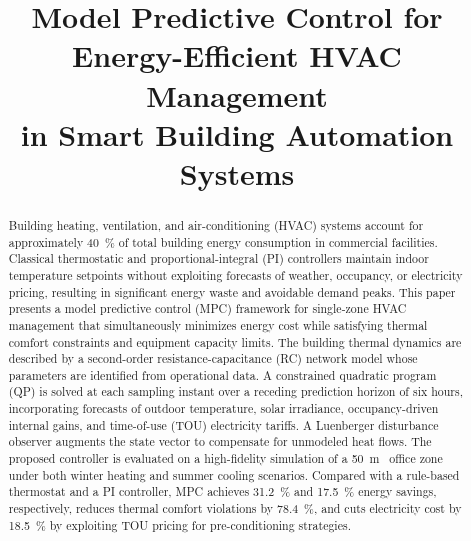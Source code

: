 \documentclass[conference,a4paper]{IEEEtran}[2015/08/26]
\begin{document}

\title{Model Predictive Control for Energy-Efficient {HVAC} Management\\
       in Smart Building Automation Systems}

\author{%
}

\maketitle

\begin{abstract}
Building heating, ventilation, and air-conditioning (HVAC) systems
account for approximately \SI{40}{\percent} of total building energy
consumption in commercial facilities. Classical thermostatic and
proportional-integral (PI) controllers maintain indoor temperature
setpoints without exploiting forecasts of weather, occupancy, or
electricity pricing, resulting in significant energy waste and avoidable
demand peaks. This paper presents a model predictive control (MPC)
framework for single-zone HVAC management that simultaneously minimizes
energy cost while satisfying thermal comfort constraints and equipment
capacity limits. The building thermal dynamics are described by a
second-order resistance-capacitance (RC) network model whose parameters
are identified from operational data. A constrained quadratic program
(QP) is solved at each sampling instant over a receding prediction
horizon of six hours, incorporating forecasts of outdoor temperature,
solar irradiance, occupancy-driven internal gains, and time-of-use (TOU)
electricity tariffs. A Luenberger disturbance observer augments the
state vector to compensate for unmodeled heat flows. The proposed
controller is evaluated on a high-fidelity simulation of a \SI{50}{\metre
\squared} office zone under both winter heating and summer cooling
scenarios. Compared with a rule-based thermostat and a PI controller,
MPC achieves \SI{31.2}{\percent} and \SI{17.5}{\percent} energy savings,
respectively, reduces thermal comfort violations by \SI{78.4}{\percent},
and cuts electricity cost by \SI{18.5}{\percent} by exploiting TOU
pricing for pre-conditioning strategies.
\end{abstract}
\end{document}
